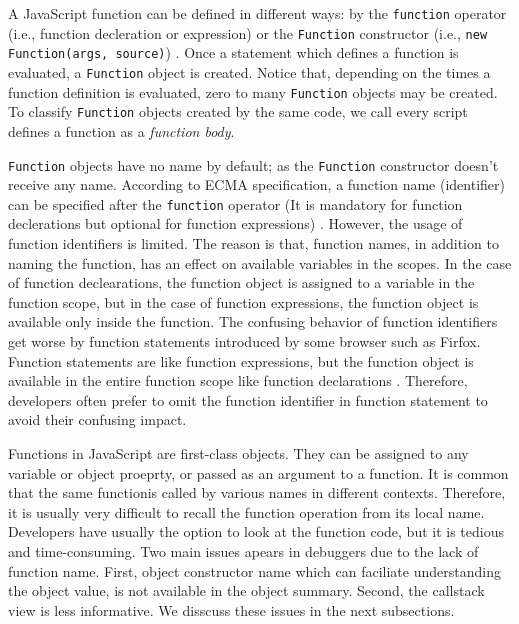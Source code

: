 \documentclass[conference]{IEEEtran}
\begin{document}
A JavaScript function can be defined in different ways: by the {\small\texttt{function}} operator (i.e., function decleration or expression) or the {\small\texttt{Function}} constructor (i.e., {\small\texttt{new Function(args, source)}}) \cite{ECMA}. Once a statement which defines a function is evaluated, a {\small\texttt{Function}} object is created. Notice that, depending on the times a function definition is evaluated, zero to many {\small\texttt{Function}} objects may be created. To classify {\small\texttt{Function}} objects created by the same code, we call every script defines a function as a \textit{function body}. 

{\small\texttt{Function}} objects have no name by default; as the {\small\texttt{Function}} constructor doesn't receive any name. According to ECMA specification, a function name (identifier) can be specified after the {\small\texttt{function}} operator (It is mandatory for function declerations but optional for function expressions) \cite{ECMA}. However, the usage of function identifiers is limited. The reason is that, function names, in addition to naming the function, has an effect on available variables in the scopes. In the case of function declearations, the function object is assigned to a variable in the function scope, but in the case of function expressions, the function object is available only inside the function. The confusing behavior of function identifiers get worse by function statements introduced by some browser such as Firfox. Function statements are like function expressions, but the function object is available in the entire function scope like function declarations \cite{Zaytsev}. Therefore, developers often prefer to omit the function identifier in function statement to avoid their confusing impact.

Functions in JavaScript are first-class objects. They can be assigned to any variable or object proeprty, or passed as an argument to a function. It is common that the same functionis called by various names in different contexts. Therefore, it is usually very difficult to recall the function operation from its local name. Developers have usually the option to look at the function code, but it is tedious and time-consuming. Two main issues apears in debuggers due to the lack of function name. First, object constructor name which can faciliate understanding the object value, is not available in the object summary. Second, the callstack view is less informative. We disscuss these issues in the next subsections.
 
\end{document}
